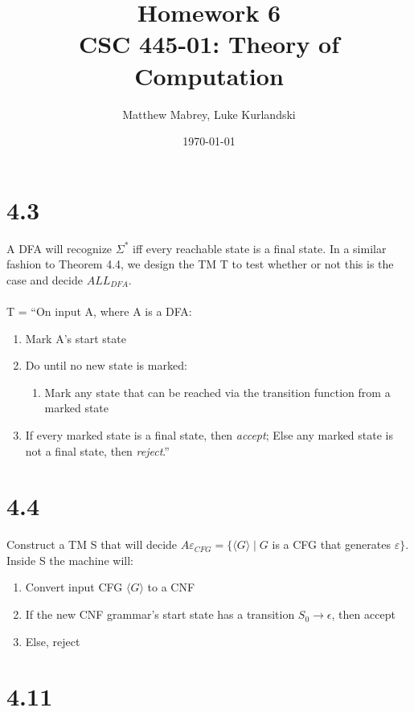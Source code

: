 \documentclass{article}
\title{Homework 6\\[0.2em]\smaller{}CSC 445-01: Theory of Computation}
\author{Matthew Mabrey, Luke Kurlandski}
\date{\today}
\begin{document}
\maketitle

\section*{4.3}

A DFA will recognize $\Sigma^*$ iff every reachable state is a final state. In a similar fashion to Theorem 4.4, we design the TM T to test whether or not this is the case and decide $ALL_{DFA}$.\\\\
T = ``On input A, where A is a DFA:
\begin{enumerate}
    \item Mark A's start state
    \item Do until no new state is marked:
    \begin{enumerate}
        \item Mark any state that can be reached via the transition function from a marked state
    \end{enumerate}
    \item If every marked state is a final state, then \textit{accept}; Else any marked state is not a final state, then \textit{reject}.''
\end{enumerate}

\section*{4.4}
Construct a TM S that will decide $A\varepsilon_{CFG} = \{\langle G \rangle \mid G$ is a CFG that generates $\varepsilon\}$. Inside S the machine will:
\begin{enumerate}
    \item Convert input CFG $\langle G \rangle$ to a CNF
    \item If the new CNF grammar's start state has a transition $S_0 \rightarrow \epsilon$, then accept
    \item Else, reject
\end{enumerate}

\section*{4.11}
\end{document}
